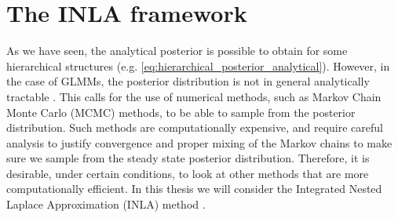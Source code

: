 



\section{The INLA framework}
\label{sec:INLA_framework}
As we have seen, the analytical posterior is possible to obtain for some hierarchical structures (e.g. \eqref{eq:hierarchical_posterior_analytical}). 
However, in the case of GLMMs, the posterior distribution is not in general analytically tractable \citep{fong2010bayesian}. This calls for the use of numerical methods, such as Markov Chain Monte Carlo (MCMC) methods, to be able to sample from the posterior distribution. 
Such methods are computationally expensive, and require careful analysis to justify convergence and proper mixing of the Markov chains to make sure we sample from the steady state posterior distribution. Therefore, it is desirable, under certain conditions, to look at other methods that are more computationally efficient.
In this thesis we will consider the Integrated Nested Laplace Approximation (INLA) method \citep{gomezrubio2020inla}.
